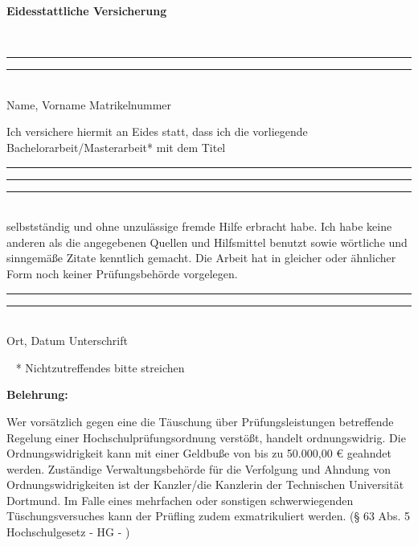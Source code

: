 \pagestyle{empty}

\normalsize


\begin{center}
{\bf Eidesstattliche Versicherung }
\end{center}
~\\
\noindent \rule{10cm}{0.4pt}   \hspace{1.5cm} \noindent \rule{3.5cm}{0.4pt}  \\
      {Name, Vorname}    \hspace{8.7cm} {Matrikelnummer}  

\vspace{0.5cm}
Ich versichere hiermit an Eides statt, dass ich die vorliegende Bachelorarbeit/Masterarbeit* mit
dem Titel

\vspace{0.5cm}
\noindent \rule{15cm}{0.4pt}

\vspace{0.5cm}

\noindent \rule{15cm}{0.4pt}

\vspace{0.5cm}
\noindent \rule{15cm}{0.4pt}
~\\
selbstst\"andig und ohne unzul\"assige fremde Hilfe erbracht habe. Ich habe
keine anderen als die angegebenen Quellen und Hilfsmittel benutzt sowie
w\"ortliche und sinngem\"aße Zitate kenntlich gemacht. Die Arbeit hat in
gleicher oder \"ahnlicher Form noch keiner Pr\"ufungsbeh\"orde vorgelegen.
~\\

\noindent \rule{5cm}{0.4pt}   \hspace{3.5cm} \noindent \rule{6cm}{0.4pt}  \\
      {Ort, Datum}    \hspace{6.5cm} {Unterschrift}  \vspace{0.2cm}

      ~ \hspace{8.5cm} {* Nichtzutreffendes bitte streichen}

\vspace{0.5cm}
{\bf Belehrung:}

Wer vors\"atzlich gegen eine die T\"auschung \"uber Pr\"ufungsleistungen
betreffende Regelung einer Hochschulpr\"ufungsordnung verst\"oßt, handelt
ordnungswidrig. Die Ordnungswidrigkeit kann mit einer Geldbuße von bis zu
50.000,00 € geahndet werden. Zust\"andige Verwaltungsbeh\"orde für die
Verfolgung und Ahndung von Ordnungswidrigkeiten ist der Kanzler/die Kanzlerin
der Technischen Universit\"at Dortmund. Im Falle eines mehrfachen oder
sonstigen schwerwiegenden T\"uschungsversuches kann der Prüfling zudem
exmatrikuliert werden. (§ 63 Abs. 5 Hochschulgesetz - HG - )

